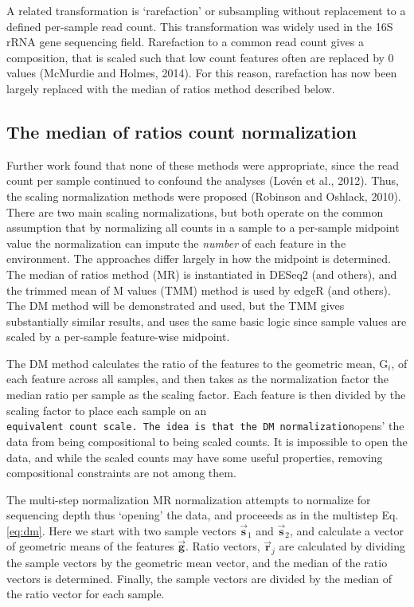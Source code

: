 \documentclass[twocolumn]{article}
\begin{document}
A related transformation is `rarefaction' or subsampling without
replacement to a defined per-sample read count. This transformation was
widely used in the 16S rRNA gene sequencing field. Rarefaction to a
common read count gives a composition, that is scaled such that low
count features often are replaced by 0 values (McMurdie and Holmes,
2014). For this reason, rarefaction has now been largely replaced with
the median of ratios method described below.

\subsection{The median of ratios count
normalization}\label{the-median-of-ratios-count-normalization}

Further work found that none of these methods were appropriate, since
the read count per sample continued to confound the analyses (Lovén et
al., 2012). Thus, the scaling normalization methods were proposed
(Robinson and Oshlack, 2010). There are two main scaling normalizations,
but both operate on the common assumption that by normalizing all counts
in a sample to a per-sample midpoint value the normalization can impute
the \emph{number} of each feature in the environment. The approaches
differ largely in how the midpoint is determined. The median of ratios
method (MR) is instantiated in DESeq2 (and others), and the trimmed mean
of M values (TMM) method is used by edgeR (and others). The DM method
will be demonstrated and used, but the TMM gives substantially similar
results, and uses the same basic logic since sample values are scaled by
a per-sample feature-wise midpoint.

The DM method calculates the ratio of the features to the geometric
mean, \(\mathrm{G}_i\), of each feature across all samples, and then
takes as the normalization factor the median ratio per sample as the
scaling factor. Each feature is then divided by the scaling factor to
place each sample on an
\texttt{equivalent\textquotesingle{}\ count\ scale.\ The\ idea\ is\ that\ the\ DM\ normalization}opens'
the data from being compositional to being scaled counts. It is
impossible to open the data, and while the scaled counts may have some
useful properties, removing compositional constraints are not among
them.

The multi-step normalization MR normalization attempts to normalize for
sequencing depth thus `opening' the data, and proceeeds as in the
multistep Eq. \ref{eq:dm}. Here we start with two sample vectors
\(\vec{\textbf{s}}_1\) and \(\vec{\textbf{s}}_2\), and calculate a
vector of geometric means of the features \(\vec{\textbf{g}}\). Ratio
vectors, \(\vec{\textbf{r}}_j\) are calculated by dividing the sample
vectors by the geometric mean vector, and the median of the ratio
vectors is determined. Finally, the sample vectors are divided by the
median of the ratio vector for each sample.
\end{document}
